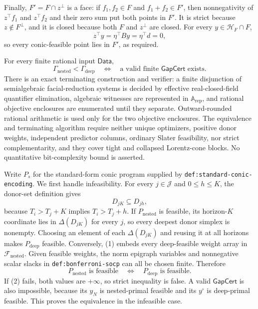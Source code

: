 Finally, \(F'=F\cap z^\perp\) is a face: if \(f_1,f_2\in F\) and \(f_1+f_2\in F'\), then nonnegativity of \(z^{\top}f_1\) and \(z^{\top}f_2\) and their zero sum put both points in \(F'\).  It is strict because \(z\notin F^\perp\), and it is closed because both \(F\) and \(z^\perp\) are closed.  For every \(y\in\mathcal H_F\cap F\),
\[
 z^{\top}y=\eta^{\top}By=\eta^{\top}d=0,
\]
so every conic-feasible point lies in \(F'\), as required.

For every finite rational input \(\mathsf{Data}\),
\[
 \Gamma_{\mathrm{nested}}<\Gamma_{\mathrm{deep}}
 \quad\Longleftrightarrow\quad
 \text{a valid finite }\mathsf{GapCert}\text{ exists}.
\]
There is an exact terminating construction and verifier: a finite disjunction of semialgebraic facial-reduction systems is decided by effective real-closed-field quantifier elimination, algebraic witnesses are represented in \(\mathbb A_{\mathrm{rep}}\), and rational objective enclosures are enumerated until they separate.  Outward-rounded rational arithmetic is used only for the two objective enclosures.  The equivalence and terminating algorithm require neither unique optimizers, positive donor weights, independent predictor columns, ordinary Slater feasibility, nor strict complementarity, and they cover tight and collapsed Lorentz-cone blocks.  No quantitative bit-complexity bound is asserted.

Write \(P_s\) for the standard-form conic program supplied by \texttt{def:standard-conic-encoding}.  We first handle infeasibility.  For every \(j\in\mathcal J\) and \(0\leq h\leq K\), the donor-set definition gives
\[
 D_{jK}\subseteq D_{jh},                                                \tag{1}
\]
because \(T_i>T_j+K\) implies \(T_i>T_j+h\).  If \(P_{\mathrm{nested}}\) is feasible, its horizon-\(K\) coordinate lies in \(\Delta(D_{jK})\) for every \(j\), so every deepest donor simplex is nonempty.  Choosing an element of each \(\Delta(D_{jK})\) and reusing it at all horizons makes \(P_{\mathrm{deep}}\) feasible.  Conversely, (1) embeds every deep-feasible weight array in \(\mathcal F_{\mathrm{nested}}\).  Given feasible weights, the norm epigraph variables and nonnegative scalar slacks in \texttt{def:bonferroni-socp} can all be chosen finite.  Therefore
\[
 P_{\mathrm{nested}}\text{ is feasible}
 \quad\Longleftrightarrow\quad
 P_{\mathrm{deep}}\text{ is feasible}.                                \tag{2}
\]
If (2) fails, both values are \(+\infty\), so strict inequality is false.  A valid \(\mathsf{GapCert}\) is also impossible, because its \(y_N\) is nested-primal feasible and its \(y^\circ\) is deep-primal feasible.  This proves the equivalence in the infeasible case.

